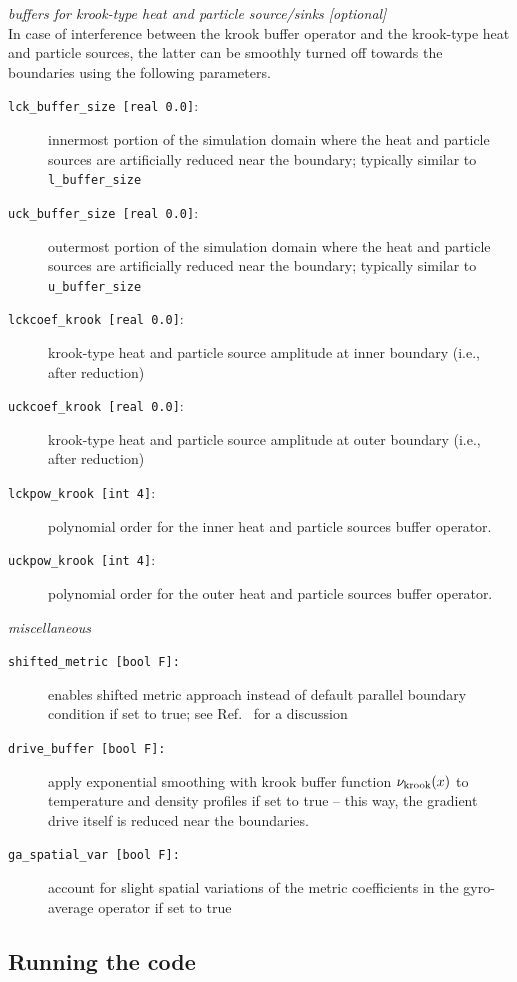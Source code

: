 \documentclass[12pt]{article}
\begin{document}
%
{\em buffers for krook-type heat and particle source/sinks [optional]}\\
In case of interference between the krook buffer operator and the krook-type heat and particle sources, the latter can be smoothly turned off towards the boundaries using
the following parameters.
\begin{description}
\item[\texttt{lck\_buffer\_size [real 0.0]}:] innermost portion of the simulation domain where the heat and particle sources are artificially reduced near the boundary; typically similar to {\tt l\_buffer\_size}
\item[\texttt{uck\_buffer\_size [real 0.0]}:] outermost portion of the simulation domain where the heat and particle sources are artificially reduced near the boundary; typically similar to {\tt u\_buffer\_size}
\item[\texttt{lckcoef\_krook [real 0.0]}:] krook-type heat and particle source amplitude at inner boundary (i.e., after reduction)
\item[\texttt{uckcoef\_krook [real 0.0]}:] krook-type heat and particle source amplitude at outer boundary (i.e., after reduction)
\item[\texttt{lckpow\_krook [int 4]}:] polynomial order for the inner heat and particle sources buffer operator.
\item[\texttt{uckpow\_krook [int 4]}:] polynomial order for the outer heat and particle sources buffer operator.
\end{description}
%
{\em miscellaneous}
\begin{description}
\item[\texttt{shifted\_metric [bool F]:}] enables shifted metric approach instead of default parallel boundary condition if set to true; see Ref.~\cite{ToldPhD} for a discussion
\item[\texttt{drive\_buffer [bool F]:}] apply exponential smoothing with krook buffer function $\nu_{\rm krook}(x)$ to temperature and density profiles if set to true -- this way, the gradient drive itself is
reduced near the boundaries.
\item[\texttt{ga\_spatial\_var [bool F]:}] account for slight spatial variations of the metric coefficients in the gyro-average operator if set to true
\end{description}
%



\newpage
\subsection{Running the code}
\end{document}
